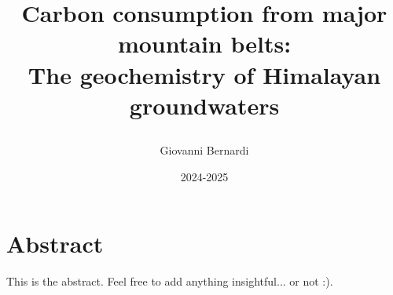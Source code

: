 \documentclass[hidelinks, 12pt]{article} %
\title{
\vspace{-1cm}
\textbf{Carbon consumption from major mountain belts: \\ The geochemistry of Himalayan groundwaters}

\vspace{0.5cm}









}
\author{Giovanni Bernardi}
\date{2024-2025} %
\begin{document}
\maketitle




\thispagestyle{empty}

\newpage

\section*{Abstract}
\label{sec:abstract}

This is the abstract. Feel free to add anything insightful... or not :).



\newpage


\thispagestyle{empty}

\tableofcontents

\newpage




\FloatBarrier
{}


















\end{document}
